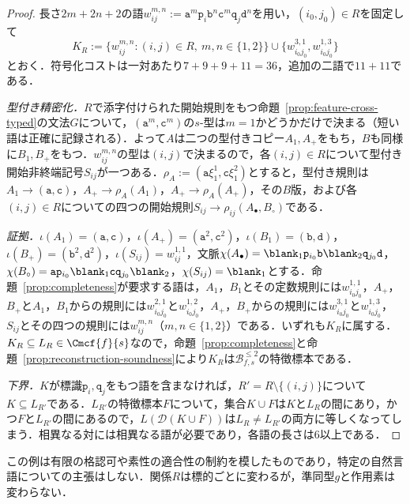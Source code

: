 \begin{proof}
長さ$2m+2n+2$の語$w^{m,n}_{ij}:=\mathtt a^m\mathtt p_i\mathtt b^n\mathtt c^m\mathtt q_j\mathtt d^n$を用い，$(i_0,j_0)\in R$を固定して
\[
 K_R:=\{w^{m,n}_{ij}:(i,j)\in R,\ m,n\in\{1,2\}\}\cup
 \{w^{3,1}_{i_0j_0},w^{1,3}_{i_0j_0}\}
\]
とおく．符号化コストは一対あたり$7+9+9+11=36$，追加の二語で$11+11$である．

\emph{型付き精密化．}$R$で添字付けられた開始規則をもつ命題~\ref{prop:feature-cross-typed}の文法$G$について，$(\mathtt a^m,\mathtt c^m)$の$s$-型は$m=1$かどうかだけで決まる（短い語は正確に記録される）．よって$A$は二つの型付きコピー$A_1,A_+$をもち，$B$も同様に$B_1,B_+$をもつ．$w^{m,n}_{ij}$の型は$(i,j)$で決まるので，各$(i,j)\in R$について型付き開始非終端記号$S_{ij}$が一つある．$\rho_A:=(\mathtt a\xi_1^1,\mathtt c\xi_1^2)$とすると，型付き規則は$A_1\to(\mathtt a,\mathtt c)$，$A_+\to\rho_A(A_1)$，$A_+\to\rho_A(A_+)$，その$B$版，および各$(i,j)\in R$についての四つの開始規則$S_{ij}\to\rho_{ij}(A_\bullet,B_\circ)$である．

\emph{証拠．}$\iota(A_1)=(\mathtt a,\mathtt c)$，$\iota(A_+)=(\mathtt a^2,\mathtt c^2)$，$\iota(B_1)=(\mathtt b,\mathtt d)$，$\iota(B_+)=(\mathtt b^2,\mathtt d^2)$，$\iota(S_{ij})=w^{1,1}_{ij}$，文脈$\chi(A_\bullet)=\blank_1\mathtt p_{i_0}\mathtt b\blank_2\mathtt q_{j_0}\mathtt d$，$\chi(B_\circ)=\mathtt a\mathtt p_{i_0}\blank_1\mathtt c\mathtt q_{j_0}\blank_2$，$\chi(S_{ij})=\blank_1$とする．命題~\ref{prop:completeness}が要求する語は，$A_1$，$B_1$とその定数規則には$w^{1,1}_{i_0j_0}$，$A_+$，$B_+$と$A_1$，$B_1$からの規則には$w^{2,1}_{i_0j_0}$と$w^{1,2}_{i_0j_0}$，$A_+$，$B_+$からの規則には$w^{3,1}_{i_0j_0}$と$w^{1,3}_{i_0j_0}$，$S_{ij}$とその四つの規則には$w^{m,n}_{ij}$（$m,n\in\{1,2\}$）である．いずれも$K_R$に属する．$K_R\subseteq L_R\in\Cmcf{f}{s}$なので，命題~\ref{prop:completeness}と命題~\ref{prop:reconstruction-soundness}により$K_R$は$\mathcal B^{\le2}_{f,s}$の特徴標本である．

\emph{下界．}$K$が標識$\mathtt p_i,\mathtt q_j$をもつ語を含まなければ，$R'=R\setminus\{(i,j)\}$について$K\subseteq L_{R'}$である．$L_{R'}$の特徴標本$F$について，集合$K\cup F$は$K$と$L_R$の間にあり，かつ$F$と$L_{R'}$の間にあるので，$L(\mathcal D(K\cup F))$は$L_R\ne L_{R'}$の両方に等しくなってしまう．相異なる対には相異なる語が必要であり，各語の長さは6以上である．
\end{proof}

この例は有限の格認可や素性の適合性の制約を模したものであり，特定の自然言語についての主張はしない．関係$R$は標的ごとに変わるが，準同型$g$と作用素は変わらない．

